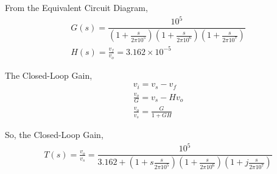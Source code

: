 \begin{enumerate}[label=\thesection.\arabic*.,ref=\thesection.\theenumi]
From the Equivalent Circuit Diagram,
\begin{align}
G(s) = \dfrac{10^5}{\left(1+\frac{s}{2\pi 10^{5}}\right)\left(1+\frac{s}{2\pi 10^{6}}\right)\left(1+\frac{s}{2\pi 10^{7}}\right)}\\
H(s) = \frac{v_{f}}{v_{o}} = 3.162\times 10^{-5}
\end{align}

The Closed-Loop Gain,
\begin{align}
v_{i} = v_{s} - v_{f}\\
\frac{v_{o}}{G} = v_{s} - Hv_{o}\\
\frac{v_{o}}{v_{s}} = \frac{G}{1+GH}
\end{align}

So, the Closed-Loop Gain,
\begin{align}
T(s) = \frac{v_{o}}{v_{s}} = \dfrac{10^5}{3.162 + \left(1+s\frac{s}{2\pi 10^{5}}\right)\left(1+\frac{s}{2\pi 10^{6}}\right)\left(1+j\frac{s}{2\pi 10^{7}}\right)}
\end{align}
\end{enumerate}
